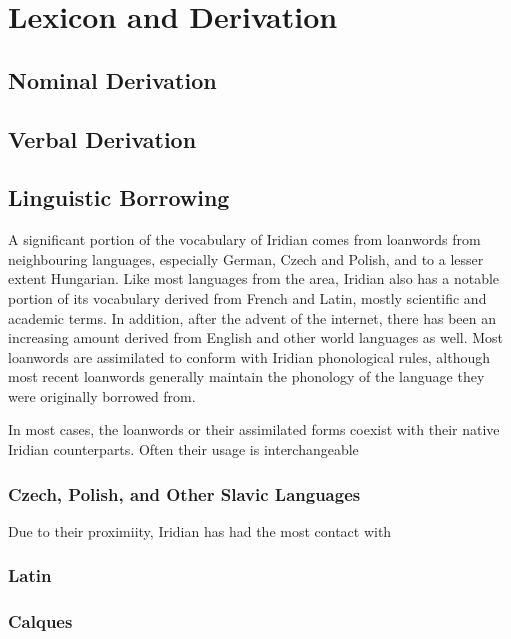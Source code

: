 \chapter{Lexicon and Derivation}

\section{Nominal Derivation}
\section{Verbal Derivation}
\section{Linguistic Borrowing}
A significant portion of the vocabulary of Iridian comes from loanwords from neighbouring languages, especially German, Czech and Polish, and to a lesser extent Hungarian. Like most languages from the area, Iridian also has a notable portion of its vocabulary derived from French and Latin, mostly scientific and academic terms. In addition, after the advent of the internet, there has been an increasing amount derived from English and other world languages as well. Most loanwords are assimilated to conform with Iridian phonological rules, although most recent loanwords generally maintain the phonology of the language they were originally borrowed from.

In most cases, the loanwords or their assimilated forms coexist with their native Iridian counterparts. Often their usage is interchangeable

\subsection{Czech, Polish, and Other Slavic Languages}
Due to their proximiity, Iridian has had the most contact with

\subsection{Latin}

\subsection{Calques}\label{sec:calques}
